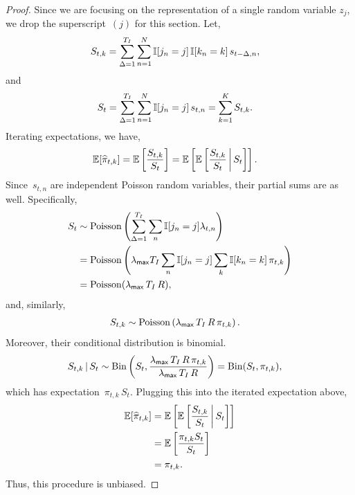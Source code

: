 \begin{proof}
  Since we are focusing on the representation of a single random variable
  $z_j$, we drop the superscript~$(j)$ for this section. Let,
  \begin{align}
    S_{t,k} &= \sum_{\Delta = 1}^{T_I} \sum_{n=1}^N \mathbb{I}[j_n=j] \, \mathbb{I}[k_n=k] \, s_{t-\Delta,n},
  \end{align}
  and
  \begin{align}
    S_{t} &= \sum_{\Delta = 1}^{T_I} \sum_{n=1}^N \mathbb{I}[j_n=j] \,  s_{t,n} = \sum_{k=1}^K S_{t,k}.
  \end{align}
  Iterating expectations, we have,
  \begin{align}
    \mathbb{E}[\widehat{\pi}_{t,k}] &=
    \mathbb{E} \left[ \frac{S_{t, k}}{S_{t}} \right]
    = \mathbb{E} \left[
      \mathbb{E} \left[
        \frac{S_{t,k}}{S_t} \, \bigg|\, S_{t}  
      \right] \right].
  \end{align}
  Since~$s_{t, n}$ are independent Poisson random variables, their partial
  sums are as well. Specifically,
  \begin{align}
    S_t &\sim \mathrm{Poisson} \left( \sum_{\Delta = 1}^{T_I} \sum_{n} \mathbb{I}[j_n=j] \lambda_{t,n} \right) \\
    &= \mathrm{Poisson} \left(\lambda_{\mathsf{max}} T_I \sum_n \mathbb{I}[j_n=j] \sum_{k} \mathbb{I}[k_n=k] \, \pi_{t,k} \right) \\
    \label{eq:S_t_rate}
    &= \mathrm{Poisson}(\lambda_{\mathsf{max}} \, T_I \, R),
  \end{align}
  and, similarly,
  \begin{align}
        S_{t,k} &\sim \mathrm{Poisson} \left( \lambda_{\mathsf{max}} \, T_I \, R \, \pi_{t, k} \right).
  \end{align}
  Moreover, their conditional distribution is binomial.
  \begin{align}
    S_{t,k} \,|\, S_t &\sim
    \mathrm{Bin} \left( S_t, \frac{\lambda_{\mathsf{max}} \, T_I \, R \, \pi_{t,k}}{\lambda_{\mathsf{max}} \, T_I \, R} \right)
    =\mathrm{Bin}(S_t, \pi_{t,k}),
  \end{align}
  which has expectation~$\pi_{t,k} \, S_t$.
  Plugging this into the iterated expectation above, 
  \begin{align}
    \mathbb{E}[\widehat{\pi}_{t,k}]
    &= \mathbb{E} \left[
      \mathbb{E} \left[
        \frac{S_{t,k}}{S_t} \, \bigg|\, S_t  \right] \right] \\
    &= \mathbb{E} \left[ 
      \frac{\pi_{t,k} S_t}{S_t} \right]\\
    &= \pi_{t,k}.
  \end{align}
  Thus, this procedure is unbiased.
\end{proof}

